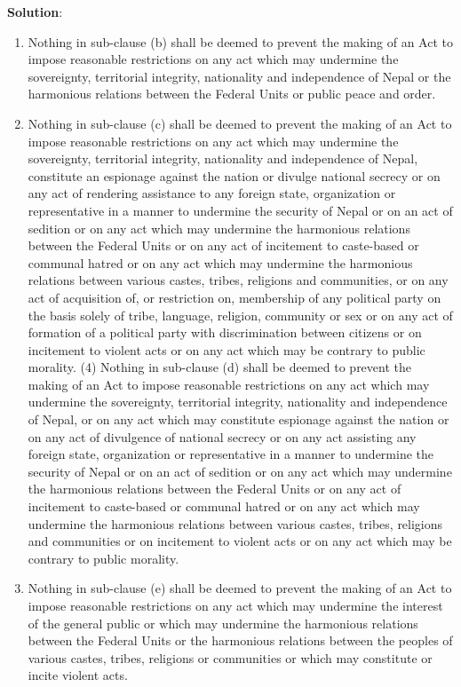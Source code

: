 \documentclass[
  openany]{book}
\newenvironment{solution}{ {\bfseries Solution}:}{}
\begin{document}
\begin{questions}
\begin{solution}
\begin{enumerate}
\begin{enumerate}
\item Nothing in sub-clause (b) shall be deemed to prevent the making of an Act to impose reasonable restrictions on any act which may undermine the sovereignty, territorial integrity, nationality and independence of Nepal or the harmonious relations between the Federal Units or public peace and order.
\item Nothing in sub-clause (c) shall be deemed to prevent the making of an Act to impose reasonable restrictions on any act which may undermine the sovereignty, territorial integrity, nationality and independence of Nepal, constitute an espionage against the nation or divulge national secrecy or on any act of rendering assistance to any foreign state, organization or representative in a manner to undermine the security of Nepal or on an act of sedition or on any act which may undermine the harmonious relations between the Federal Units or on any act of incitement to caste-based or communal hatred or on any act which may undermine the harmonious relations between various castes, tribes, religions and communities, or on any act of acquisition of, or restriction on, membership of any political party on the basis solely of tribe, language, religion, community or sex or on any act of formation of a political party with discrimination between citizens or on incitement to violent acts or on any act which may be contrary to public morality. (4) Nothing in sub-clause (d) shall be deemed to prevent the making of an Act to impose reasonable restrictions on any act which may undermine the sovereignty, territorial integrity, nationality and independence of Nepal, or on any act which may constitute espionage against the nation or on any act of divulgence of national secrecy or on any act assisting any foreign state, organization or representative in a manner to undermine the security of Nepal or on an act of sedition or on any act which may undermine the harmonious relations between the Federal Units or on any act of incitement to caste-based or communal hatred or on any act which may undermine the harmonious relations between various castes, tribes, religions and communities or on incitement to violent acts or on any act which may be contrary to public morality.
\item Nothing in sub-clause (e) shall be deemed to prevent the making of an Act to impose reasonable restrictions on any act which may undermine the interest of the general public or which may undermine the harmonious relations between the Federal Units or the harmonious relations between the peoples of various castes, tribes, religions or communities or which may constitute or incite violent acts.

\end{enumerate}
\end{enumerate}
\end{solution}
\end{questions}
\end{document}
